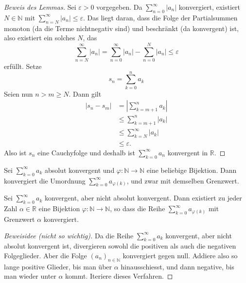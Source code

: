 \documentclass[../main.tex]{subfiles}
\begin{document}
\begin{proof}[Beweis des Lemmas]
  Sei $\varepsilon > 0$ vorgegeben. Da
  $\sum_{n=0}^{\infty} |a_n|$ 
  konvergiert, existiert $N \in \mathbb{N}$ mit
  $\sum_{n=N}^{\infty} |a_n| \leq \varepsilon$.
  Das liegt daran, dass die Folge der
  Partialsummen monoton (da die Terme nichtnegativ sind)
  und beschränkt (da konvergent) ist,
  also existiert ein solches $N$, das
  \[
    \sum_{n=N}^{\infty} |a_n| = \sum_{n=0}^{\infty} |a_n|
    - \sum_{n=0}^{N} |a_n| \leq \varepsilon
  \]
  erfüllt. Setze 
  \[
    s_n = \sum_{k=0}^{n} a_k
  \]
  Seien  nun $n > m \geq N$. Dann gilt
  \begin{align*}
    |s_n - s_m| & = \left| \sum_{k=m+1}^{n} a_k \right|\\
                & \leq \sum_{k=m+1}^{n} |a_k| \\
                & \leq \sum_{k=N}^{\infty} |a_k| \\
                & \leq \varepsilon.
  \end{align*}
  Also ist $s_n$ eine 
  Cauchyfolge und deshalb ist $\sum_{k=0}^{\infty} a_n$ konvergent
  in $\mathbb{R}$.
\end{proof}

\begin{manualtheorem}{3}
  Sei $\sum_{k=0}^{\infty} a_k$ absolut konvergent
  und $\varphi \colon \mathbb{N} \to \mathbb{N}$ eine
  beliebige Bijektion.
  Dann konvergiert die
  Umordnung
  $\sum_{k=0}^{\infty} a_{\varphi(k)}$, und
  zwar mit demselben Grenzwert.
\end{manualtheorem}


\begin{zusatz}
  Sei $\sum_{k=0}^{\infty} a_k$ konvergent,
  aber nicht absolut konvergent.
  Dann existiert zu jeder Zahl
  $\alpha \in \mathbb{R}$ eine
  Bijektion $\varphi \colon \mathbb{N} \to \mathbb{N}$,
  so dass die Reihe $\sum_{k=0}^{\infty} a_{\varphi(k)}$ 
  mit Grenzwert $\alpha$ konvergiert.
\end{zusatz}

\begin{proof}[Beweisidee (nicht so wichtig)]
  Da die Reihe $\sum_{k=0}^{\infty} a_k$ konvergent,
  aber nicht absolut konvergent ist,
  divergieren sowohl die positiven als auch die negativen
  Folgeglieder. Aber die Folge ${(a_{n})}_{n \in \mathbb{N}}$
  konvergiert gegen null. Addiere also so lange
  positive Glieder, bis man über $\alpha$ hinausschiesst,
  und dann negative, bis man wieder unter $\alpha$ kommt.
  Iteriere dieses Verfahren.
\end{proof}
\end{document}
